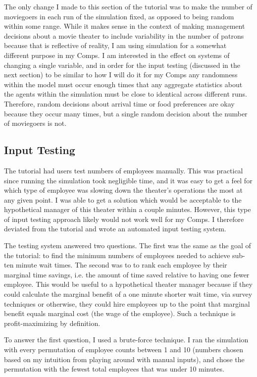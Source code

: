 \documentclass[10pt,twocolumn]{article}
\begin{document}
The only change I made to this section of the tutorial was to make the number of moviegoers in each run of the simulation fixed, as opposed to being random within some range. While it makes sense in the context of making management decisions about a movie theater to include variability in the number of patrons because that is reflective of reality, I am using simulation for a somewhat different purpose in my Comps. I am interested in the effect on systems of changing a single variable, and in order for the input testing (discussed in the next section) to be similar to how I will do it for my Comps any randomness within the model must occur enough times that any aggregate statistics about the agents within the simulation must be close to identical across different runs. Therefore, random decisions about arrival time or food preferences are okay because they occur many times, but a single random decision about the number of moviegoers is not. 

\subsection{Input Testing}

The tutorial had users test numbers of employees manually. This was practical since running the simulation took negligible time, and it was easy to get a feel for which type of employee was slowing down the theater's operations the most at any given point. I was able to get a solution which would be acceptable to the hypothetical manager of this theater within a couple minutes. However, this type of input testing approach likely would not work well for my Comps. I therefore deviated from the tutorial and wrote an automated input testing system. 

The testing system answered two questions. The first was the same as the goal of the tutorial: to find the minimum numbers of employees needed to achieve sub-ten minute wait times. The second was to to rank each employee by their marginal time savings, i.e. the amount of time saved relative to having one fewer employee. This would be useful to a hypothetical theater manager because if they could calculate the marginal benefit of a one minute shorter wait time, via survey techniques or otherwise, they could hire employees up to the point that marginal benefit equals marginal cost (the wage of the employee). Such a technique is profit-maximizing by definition. 

To answer the first question, I used a brute-force technique. I ran the simulation with every permutation of employee counts between 1 and 10 (numbers chosen based on my intuition from playing around with manual inputs), and chose the permutation with the fewest total employees that was under 10 minutes. 
\end{document}

